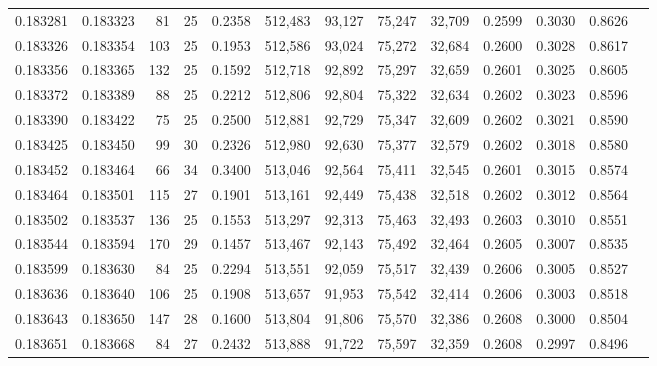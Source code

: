\begin{tabular}{rrrrrrrrrrrrr}
0.183281 & 0.183323 &    81 &  25 &                                     0.2358 & 512,483 &  93,127 &  75,247 &  32,709 & 0.2599 & 0.3030 & 0.8626 \\
0.183326 & 0.183354 &   103 &  25 &                                     0.1953 & 512,586 &  93,024 &  75,272 &  32,684 & 0.2600 & 0.3028 & 0.8617 \\
0.183356 & 0.183365 &   132 &  25 &                                     0.1592 & 512,718 &  92,892 &  75,297 &  32,659 & 0.2601 & 0.3025 & 0.8605 \\
0.183372 & 0.183389 &    88 &  25 &                                     0.2212 & 512,806 &  92,804 &  75,322 &  32,634 & 0.2602 & 0.3023 & 0.8596 \\
0.183390 & 0.183422 &    75 &  25 &                                     0.2500 & 512,881 &  92,729 &  75,347 &  32,609 & 0.2602 & 0.3021 & 0.8590 \\
0.183425 & 0.183450 &    99 &  30 &                                     0.2326 & 512,980 &  92,630 &  75,377 &  32,579 & 0.2602 & 0.3018 & 0.8580 \\
0.183452 & 0.183464 &    66 &  34 &                                     0.3400 & 513,046 &  92,564 &  75,411 &  32,545 & 0.2601 & 0.3015 & 0.8574 \\
0.183464 & 0.183501 &   115 &  27 &                                     0.1901 & 513,161 &  92,449 &  75,438 &  32,518 & 0.2602 & 0.3012 & 0.8564 \\
0.183502 & 0.183537 &   136 &  25 &                                     0.1553 & 513,297 &  92,313 &  75,463 &  32,493 & 0.2603 & 0.3010 & 0.8551 \\
0.183544 & 0.183594 &   170 &  29 &                                     0.1457 & 513,467 &  92,143 &  75,492 &  32,464 & 0.2605 & 0.3007 & 0.8535 \\
0.183599 & 0.183630 &    84 &  25 &                                     0.2294 & 513,551 &  92,059 &  75,517 &  32,439 & 0.2606 & 0.3005 & 0.8527 \\
0.183636 & 0.183640 &   106 &  25 &                                     0.1908 & 513,657 &  91,953 &  75,542 &  32,414 & 0.2606 & 0.3003 & 0.8518 \\
0.183643 & 0.183650 &   147 &  28 &                                     0.1600 & 513,804 &  91,806 &  75,570 &  32,386 & 0.2608 & 0.3000 & 0.8504 \\
0.183651 & 0.183668 &    84 &  27 &                                     0.2432 & 513,888 &  91,722 &  75,597 &  32,359 & 0.2608 & 0.2997 & 0.8496 \\

\end{tabular}
